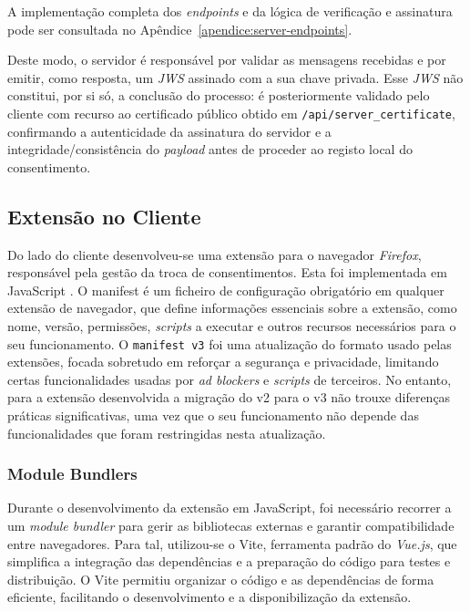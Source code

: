 A implementação completa dos \textit{endpoints} e da lógica de verificação e assinatura pode ser consultada no Apêndice~\ref{apendice:server-endpoints}.

Deste modo, o servidor é responsável por validar as mensagens recebidas e por emitir, como resposta, um \textit{JWS} assinado com a sua chave privada. Esse \textit{JWS} não constitui, por si só, a conclusão do processo: é posteriormente validado pelo cliente com recurso ao certificado público obtido em \texttt{/api/server\_certificate}, confirmando a autenticidade da assinatura do servidor e a integridade/consistência do \textit{payload} antes de proceder ao registo local do consentimento.

\subsection{Extensão no Cliente}
Do lado do cliente desenvolveu-se uma extensão para o navegador \textit{Firefox}, responsável pela gestão da troca de consentimentos. Esta foi implementada em JavaScript \citep{MozillaBrowserExtensions}. O manifest é um ficheiro de configuração obrigatório em qualquer extensão de navegador, que define informações essenciais sobre a extensão, como nome, versão, permissões, \textit{scripts} a executar e outros recursos necessários para o seu funcionamento. O \texttt{manifest v3} foi uma atualização do formato usado pelas extensões, focada sobretudo em reforçar a segurança e privacidade, limitando certas funcionalidades usadas por \textit{ad blockers} e \textit{scripts} de terceiros. No entanto, para a extensão desenvolvida a migração do v2 para o v3 não trouxe diferenças práticas significativas, uma vez que o seu funcionamento não depende das funcionalidades que foram restringidas nesta atualização.

\subsubsection{Module Bundlers}

Durante o desenvolvimento da extensão em JavaScript, foi necessário recorrer a um \textit{module bundler} para gerir as bibliotecas externas e garantir compatibilidade entre navegadores. Para tal, utilizou-se o Vite, ferramenta padrão do \textit{Vue.js}, que simplifica a integração das dependências e a preparação do código para testes e distribuição. O Vite permitiu organizar o código e as dependências de forma eficiente, facilitando o desenvolvimento e a disponibilização da extensão.

